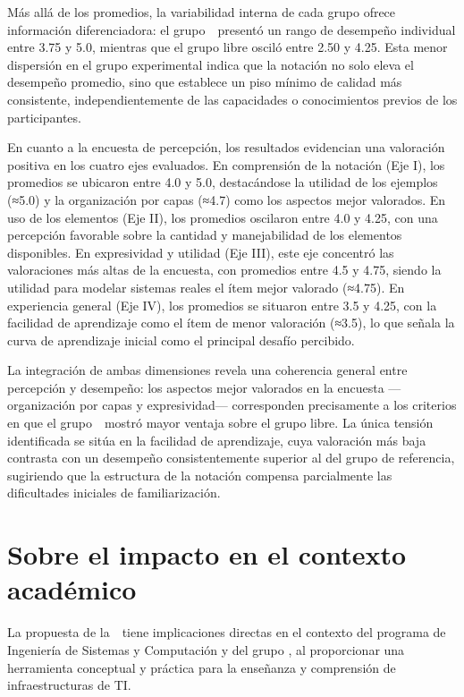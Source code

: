 Más allá de los promedios, la variabilidad interna de cada grupo ofrece información diferenciadora: el grupo~\NDITI~presentó un rango de desempeño individual entre 3.75 y 5.0, mientras que el grupo libre osciló entre 2.50 y 4.25. Esta menor dispersión en el grupo experimental indica que la notación no solo eleva el desempeño promedio, sino que establece un piso mínimo de calidad más consistente, independientemente de las capacidades o conocimientos previos de los participantes.

En cuanto a la encuesta de percepción, los resultados evidencian una valoración positiva en los cuatro ejes evaluados. En comprensión de la notación (Eje I), los promedios se ubicaron entre 4.0 y 5.0, destacándose la utilidad de los ejemplos (≈5.0) y la organización por capas (≈4.7) como los aspectos mejor valorados. En uso de los elementos (Eje II), los promedios oscilaron entre 4.0 y 4.25, con una percepción favorable sobre la cantidad y manejabilidad de los elementos disponibles. En expresividad y utilidad (Eje III), este eje concentró las valoraciones más altas de la encuesta, con promedios entre 4.5 y 4.75, siendo la utilidad para modelar sistemas reales el ítem mejor valorado (≈4.75). En experiencia general (Eje IV), los promedios se situaron entre 3.5 y 4.25, con la facilidad de aprendizaje como el ítem de menor valoración (≈3.5), lo que señala la curva de aprendizaje inicial como el principal desafío percibido.

La integración de ambas dimensiones revela una coherencia general entre percepción y desempeño: los aspectos mejor valorados en la encuesta —organización por capas y expresividad— corresponden precisamente a los criterios en que el grupo~\NDITI~mostró mayor ventaja sobre el grupo libre. La única tensión identificada se sitúa en la facilidad de aprendizaje, cuya valoración más baja contrasta con un desempeño consistentemente superior al del grupo de referencia, sugiriendo que la estructura de la notación compensa parcialmente las dificultades iniciales de familiarización.

\section{Sobre el impacto en el contexto académico}
\noindent
La propuesta de la~\NDITI~tiene implicaciones directas en el contexto del programa de Ingeniería de Sistemas y Computación y del grupo \GRID, al proporcionar una herramienta conceptual y práctica para la enseñanza y comprensión de infraestructuras de TI.

